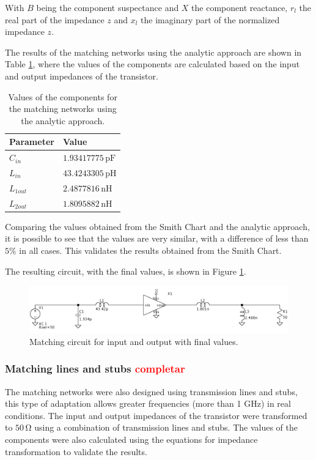 With $B$ being the component suspectance and $X$ the component reactance, $r_l$ the real part of the impedance $z$ and $x_l$ the imaginary part of the  normalized impedance $z$.

The results of the matching networks using the analytic approach are shown in Table \ref{tab:MatchingValues}, where the values of the components are calculated based on the input and output impedances of the transistor.

\begin{table}[H]
    \centering
    \caption{Values of the components for the matching networks using the analytic approach.}
    \begin{tabularx}{\textwidth}{>{\centering\arraybackslash}X >{\centering\arraybackslash}X}
        \toprule
        \textbf{Parameter} & \textbf{Value} \\
        \midrule
        $C_{in}$     & $1.93417775\,\si{\pico\farad}$ \\
        \midrule
        $L_{in}$     & $43.4243305\,\si{\pico\henry}$\\
        \midrule
        $L_{1out}$   & $2.4877816\,\si{\nano\henry}$ \\
        \midrule
        $L_{2out}$   & $1.8095882\,\si{\nano\henry}$\\
        \bottomrule
    \end{tabularx}
    \label{tab:MatchingValues}
\end{table}

Comparing the values obtained from the Smith Chart and the analytic approach, it is possible to see that the values are very similar, with a difference of less than $5\%$ in all cases. This validates the results obtained from the Smith Chart.

The resulting circuit, with the final values, is shown in Figure \ref{fig:MatchingCircuit}.
\begin{figure}[H]
    \centering
    \includegraphics[width=1\textwidth]{Images/LC_matching-circuit.png}
    \caption{Matching circuit for input and output with final values.}
    \label{fig:MatchingCircuit}
\end{figure}

\subsubsection{Matching lines and stubs \textcolor{red}{completar}}
The matching networks were also designed using transmission lines and stubs, this type of adaptation allows greater frequencies (more than 1 \si{\giga \hertz}) in real conditions. The input and output impedances of the transistor were transformed to $50\,\si{\ohm}$ using a combination of transmission lines and stubs. The values of the components were also calculated using the equations for impedance transformation to validate the results.

